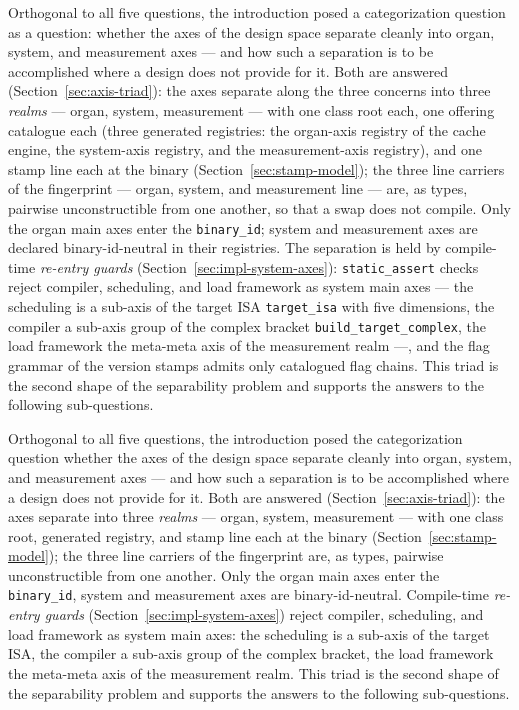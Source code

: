 \begin{nurlang}
Orthogonal to all five questions, the introduction posed a categorization question as a question:
whether the axes of the design space separate cleanly into organ, system, and measurement axes ---
and how such a separation is to be accomplished where a design does not provide for it. Both are
answered (Section~\ref{sec:axis-triad}): the axes separate along the three concerns into three
\emph{realms} --- organ, system, measurement --- with one class root each, one offering catalogue each
(three generated registries: the organ-axis registry of the cache engine, the system-axis registry,
and the measurement-axis registry), and one stamp line each at the binary
(Section~\ref{sec:stamp-model}); the three line carriers of the fingerprint --- organ, system, and
measurement line --- are, as types, pairwise unconstructible from one another, so that a swap does
not compile. Only the organ main axes enter the \texttt{binary\_id}; system and measurement axes are
declared binary-id-neutral in their registries. The separation is held by compile-time
\emph{re-entry guards} (Section~\ref{sec:impl-system-axes}): \texttt{static\_assert} checks reject
compiler, scheduling, and load framework as system main axes --- the scheduling is a sub-axis of the
target ISA \texttt{target\_isa} with five dimensions, the compiler a sub-axis group of the complex
bracket \texttt{build\_target\_complex}, the load framework the meta-meta axis of the measurement
realm ---, and the flag grammar of the version stamps admits only catalogued flag chains. This triad
is the second shape of the separability problem and supports the answers to the following
sub-questions.
\end{nurlang}
\begin{nurkurz}
Orthogonal to all five questions, the introduction posed the categorization question whether the axes of
the design space separate cleanly into organ, system, and measurement axes --- and how such a separation is
to be accomplished where a design does not provide for it. Both are answered
(Section~\ref{sec:axis-triad}): the axes separate into three \emph{realms} --- organ, system, measurement
--- with one class root, generated registry, and stamp line each at the binary
(Section~\ref{sec:stamp-model}); the three line carriers of the fingerprint are, as types, pairwise
unconstructible from one another. Only the organ main axes enter the \texttt{binary\_id}, system and
measurement axes are binary-id-neutral. Compile-time \emph{re-entry guards}
(Section~\ref{sec:impl-system-axes}) reject compiler, scheduling, and load framework as system main axes:
the scheduling is a sub-axis of the target ISA, the compiler a sub-axis group of the complex bracket, the
load framework the meta-meta axis of the measurement realm. This triad is the second shape of the
separability problem and supports the answers to the following sub-questions.
\end{nurkurz}

